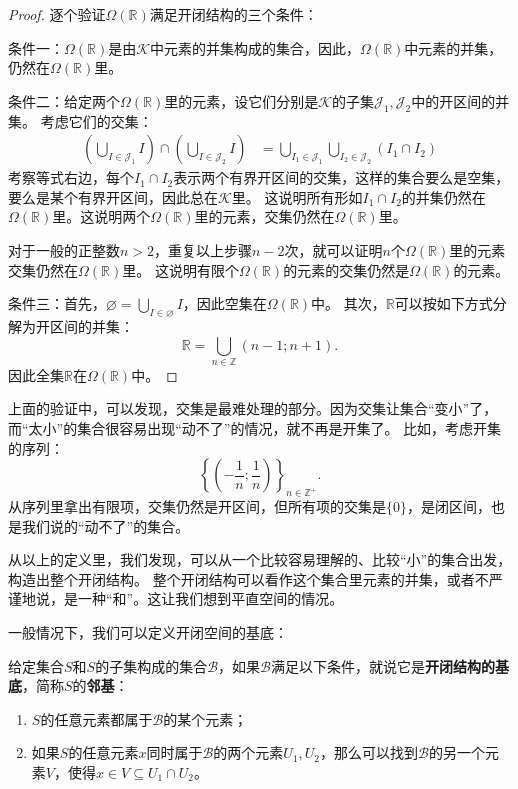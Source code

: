 \documentclass[12pt,UTF8]{ctexbook}
\begin{document}
\begin{appendix}
\begin{proof}
    逐个验证$\Omega(\mathbb{R})$满足开闭结构的三个条件：

    条件一：$\Omega(\mathbb{R})$是由$\mathcal{K}$中元素的并集构成的集合，因此，$\Omega(\mathbb{R})$中元素的并集，仍然在$\Omega(\mathbb{R})$里。

    条件二：给定两个$\Omega(\mathbb{R})$里的元素，设它们分别是$\mathcal{K}$的子集$\mathcal{J}_1, \mathcal{J}_2$中的开区间的并集。
    考虑它们的交集：
    \begin{align*}
        \left(\bigcup_{I \in \mathcal{J}_1} I\right) \cap \left(\bigcup_{I \in \mathcal{J}_2} I\right) &= \bigcup_{I_1 \in \mathcal{J}_1} \bigcup_{I_2 \in \mathcal{J}_2} (I_1 \cap I_2)   
    \end{align*}
    考察等式右边，每个$I_1 \cap I_2$表示两个有界开区间的交集，这样的集合要么是空集，要么是某个有界开区间，因此总在$\mathcal{K}$里。
    这说明所有形如$I_1 \cap I_2$的并集仍然在$\Omega(\mathbb{R})$里。这说明两个$\Omega(\mathbb{R})$里的元素，交集仍然在$\Omega(\mathbb{R})$里。

    对于一般的正整数$n>2$，重复以上步骤$n-2$次，就可以证明$n$个$\Omega(\mathbb{R})$里的元素交集仍然在$\Omega(\mathbb{R})$里。
    这说明有限个$\Omega(\mathbb{R})$的元素的交集仍然是$\Omega(\mathbb{R})$的元素。

    条件三：首先，$\varnothing = \bigcup_{I \in \varnothing} I $，因此空集在$\Omega(\mathbb{R})$中。
    其次，$\mathbb{R}$可以按如下方式分解为开区间的并集：
    $$ \mathbb{R} = \bigcup_{n\in \mathbb{Z}} (n-1;n+1) . $$
    因此全集$\mathbb{R}$在$\Omega(\mathbb{R})$中。

\end{proof}

上面的验证中，可以发现，交集是最难处理的部分。因为交集让集合“变小”了，而“太小”的集合很容易出现“动不了”的情况，就不再是开集了。
比如，考虑开集的序列：
$$ \left\{ \left(-\frac{1}{n};\frac{1}{n}\right)\right\}_{n\in\mathbb{Z}^+}.$$
从序列里拿出有限项，交集仍然是开区间，但所有项的交集是$\{0\}$，是闭区间，也是我们说的“动不了”的集合。

从以上的定义里，我们发现，可以从一个比较容易理解的、比较“小”的集合出发，构造出整个开闭结构。
整个开闭结构可以看作这个集合里元素的并集，或者不严谨地说，是一种“和”。这让我们想到平直空间的情况。

一般情况下，我们可以定义开闭空间的基底：
\begin{df}
    给定集合$S$和$S$的子集构成的集合$\mathcal{B}$，如果$\mathcal{B}$满足以下条件，就说它是\textbf{开闭结构的基底}，简称$S$的\textbf{邻基}：
    \begin{enumerate}
        \item $S$的任意元素都属于$\mathcal{B}$的某个元素；
        \item 如果$S$的任意元素$x$同时属于$\mathcal{B}$的两个元素$U_1, U_2$，那么可以找到$\mathcal{B}$的另一个元素$V$，使得$x\in V\subseteq U_1\cap U_2$。
    \end{enumerate}
\end{df}


\end{appendix}
\end{document}

